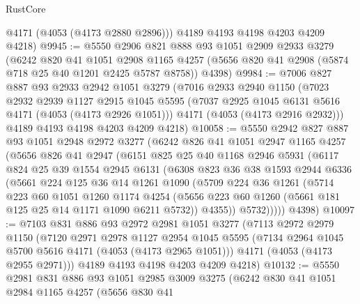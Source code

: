 \begin{lexlean}{RustCore}
\begin{coremodule}
        @4171
        (@4053 (@4173 @2880 @2896)))
      @4189
      @4193
      @4198
      @4203
      @4209
      @4218)
@9945 := @5550
    @2906
    @821
    @888
    @93
    @1051
    @2909
    @2933
    @3279
    (@6242
      @820
      @41
      @1051
      @2908
      @1165
      @4257
      (@5656 @820 @41 @2908 (@5874 @718 @25 @40 @1201 @2425 @5787 @8758))
      @4398)
@9984 := @7006
    @827
    @887
    @93
    @2933
    @2942
    @1051
    @3279
    (@7016
      @2933
      @2940
      @1150
      (@7023
        @2932
        @2939
        @1127
        @2915
        @1045
        @5595
        (@7037 @2925 @1045 @6131 @5616 @4171 (@4053 (@4173 @2926 @1051)))
        @4171
        (@4053 (@4173 @2916 @2932)))
      @4189
      @4193
      @4198
      @4203
      @4209
      @4218)
@10058 := @5550
    @2942
    @827
    @887
    @93
    @1051
    @2948
    @2972
    @3277
    (@6242
      @826
      @41
      @1051
      @2947
      @1165
      @4257
      (@5656
        @826
        @41
        @2947
        (@6151
          @825
          @25
          @40
          @1168
          @2946
          @5931
          (@6117
            @824
            @25
            @39
            @1554
            @2945
            @6131
            (@6308
              @823
              @36
              @38
              @1593
              @2944
              @6336
              (@5661
                @224
                @125
                @36
                @14
                @1261
                @1090
                (@5709
                  @224
                  @36
                  @1261
                  (@5714
                    @223
                    @60
                    @1051
                    @1260
                    @1174
                    @4254
                    (@5656 @223 @60 @1260 (@5661 @181 @125 @25 @14 @1171 @1090 @6211 @5732))
                    @4355))
                @5732)))))
      @4398)
@10097 := @7103
    @831
    @886
    @93
    @2972
    @2981
    @1051
    @3277
    (@7113
      @2972
      @2979
      @1150
      (@7120
        @2971
        @2978
        @1127
        @2954
        @1045
        @5595
        (@7134 @2964 @1045 @5700 @5616 @4171 (@4053 (@4173 @2965 @1051)))
        @4171
        (@4053 (@4173 @2955 @2971)))
      @4189
      @4193
      @4198
      @4203
      @4209
      @4218)
@10132 := @5550
    @2981
    @831
    @886
    @93
    @1051
    @2985
    @3009
    @3275
    (@6242
      @830
      @41
      @1051
      @2984
      @1165
      @4257
      (@5656
        @830
        @41

\end{coremodule}
\end{lexlean}

